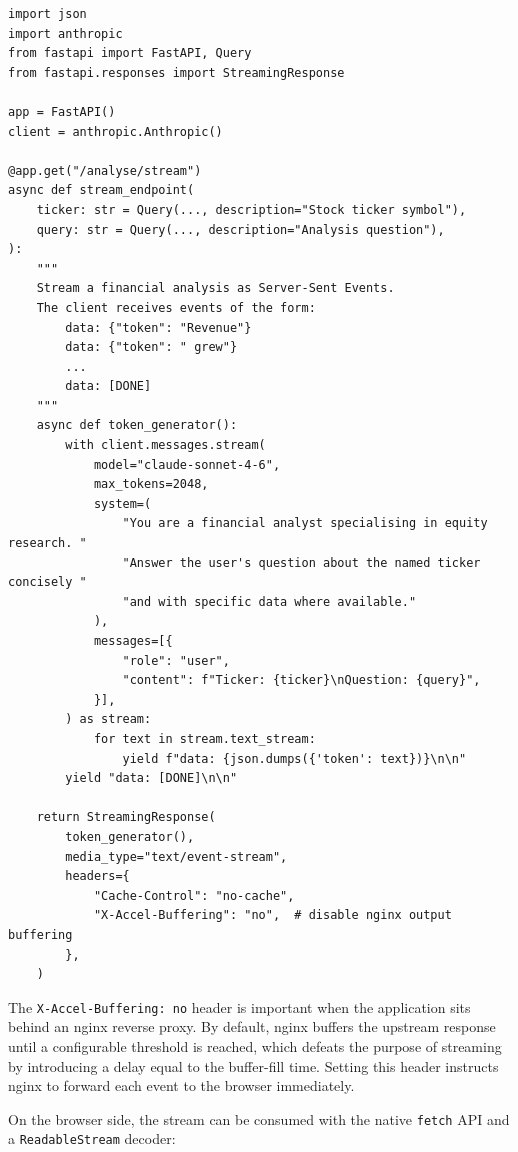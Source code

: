 \begin{verbatim}
import json
import anthropic
from fastapi import FastAPI, Query
from fastapi.responses import StreamingResponse

app = FastAPI()
client = anthropic.Anthropic()

@app.get("/analyse/stream")
async def stream_endpoint(
    ticker: str = Query(..., description="Stock ticker symbol"),
    query: str = Query(..., description="Analysis question"),
):
    """
    Stream a financial analysis as Server-Sent Events.
    The client receives events of the form:
        data: {"token": "Revenue"}
        data: {"token": " grew"}
        ...
        data: [DONE]
    """
    async def token_generator():
        with client.messages.stream(
            model="claude-sonnet-4-6",
            max_tokens=2048,
            system=(
                "You are a financial analyst specialising in equity research. "
                "Answer the user's question about the named ticker concisely "
                "and with specific data where available."
            ),
            messages=[{
                "role": "user",
                "content": f"Ticker: {ticker}\nQuestion: {query}",
            }],
        ) as stream:
            for text in stream.text_stream:
                yield f"data: {json.dumps({'token': text})}\n\n"
        yield "data: [DONE]\n\n"

    return StreamingResponse(
        token_generator(),
        media_type="text/event-stream",
        headers={
            "Cache-Control": "no-cache",
            "X-Accel-Buffering": "no",  # disable nginx output buffering
        },
    )
\end{verbatim}

The \texttt{X-Accel-Buffering: no} header is important when the application sits
behind an nginx reverse proxy. By default, nginx buffers the upstream response until a
configurable threshold is reached, which defeats the purpose of streaming by
introducing a delay equal to the buffer-fill time. Setting this header instructs nginx
to forward each event to the browser immediately.

On the browser side, the stream can be consumed with the native \texttt{fetch} API
and a \texttt{ReadableStream} decoder:

